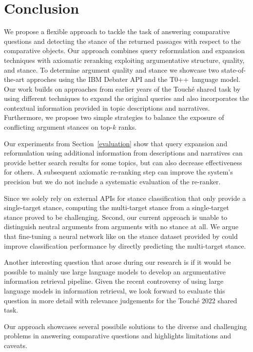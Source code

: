 \section{Conclusion}

We propose a flexible approach to tackle the task of answering comparative questions and detecting the stance of the returned passages with respect to the comparative objects.
Our approach combines query reformulation and expansion techniques with axiomatic reranking exploiting argumentative structure, quality, and stance.
To determine argument quality and stance we showcase two state-of-the-art approches using the IBM Debater API and the T0++~language model.
Our work builds on approaches from earlier years of the Touché shared task by using different techniques to expand the original queries and also incorporates the contextual information provided in topic descriptions and narratives.
Furthermore, we propose two simple strategies to balance the exposure of conflicting argument stances on top-\(k\) ranks.

Our experiments from Section~\ref{evaluation} show that query expansion and reformulation using additional information from descriptions and narratives can provide better search results for some topics, but can also decrease effectiveness for others.
A subsequent axiomatic re-ranking step can improve the system's precision but we do not include a systematic evaluation of the re-ranker.

Since we solely rely on external APIs for stance classification that only provide a single-target stance, computing the multi-target stance from a single-target stance proved to be challenging.
Second, our current approach is unable to distinguish neutral arguments from arguments with no stance at all.
We argue that fine-tuning a neural network like \Bert on the stance dataset provided by \citeauthor{BondarenkoFKSGBPBSWPH2022} could improve classification performance by directly predicting the multi-target stance.

Another interesting question that arose during our research is if it would be possible to mainly use large language models to develop an argumentative information retrieval pipeline.
Given the recent controversy of using large language models in information retrieval, we look forward to evaluate this question in more detail with relevance judgements for the Touché 2022 shared task.

Our approach showcases several possibile solutions to the diverse and challenging problems in answering comparative questions and highlights limitations and caveats.
